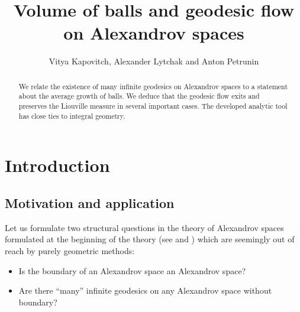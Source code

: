 \documentclass[12pt,leqno]{amsart}
\numberwithin{equation}{section}
\theoremstyle{definition}
\theoremstyle{remark}
\begin{document}
\pagebreak
%


\title{Volume of balls and geodesic flow  on Alexandrov spaces}

\author{Vitya Kapovitch, Alexander Lytchak and Anton Petrunin}







\begin{abstract}
 We relate the existence of many infinite geodesics on Alexandrov spaces to a statement about the average growth of balls. We deduce that the geodesic flow exits and preserves the Liouville measure in several important cases. The developed analytic tool has close ties  to integral geometry.
\end{abstract}


\maketitle
\renewcommand{\theequation}{\arabic{section}.\arabic{equation}}


\section{Introduction}
\subsection{Motivation and application}
Let us formulate two structural questions in the theory of Alexandrov spaces formulated at the beginning of the theory (see \cite{BGP} and \cite{P2}) which are seemingly out of reach by purely geometric methods:  
\begin{itemize}
\item Is the boundary of an Alexandrov space an Alexandrov space?
\item Are there  ``many'' infinite geodesics on any Alexandrov space without boundary?
\end{itemize}
   
\end{document}
